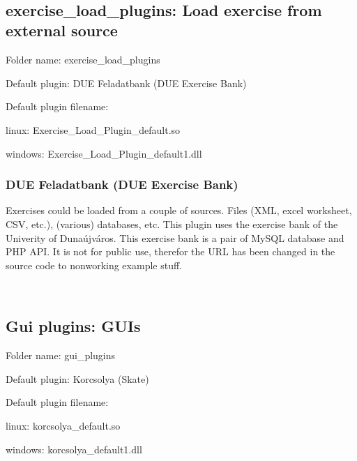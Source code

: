 ~\newline
~\newline
~\newline




\hypertarget{index_exercise_load_plugins}{}\subsection{exercise\+\_\+load\+\_\+plugins\+: Load exercise from external source}\label{index_exercise_load_plugins}

\begin{DoxyItemize}
\item Folder name\+: exercise\+\_\+load\+\_\+plugins
\item Default plugin\+: D\+UE Feladatbank (D\+UE Exercise Bank)
\item Default plugin filename\+:
\begin{DoxyItemize}
\item linux\+: Exercise\+\_\+\+Load\+\_\+\+Plugin\+\_\+default.\+so
\item windows\+: Exercise\+\_\+\+Load\+\_\+\+Plugin\+\_\+default1.\+dll
\end{DoxyItemize}
\end{DoxyItemize}\hypertarget{index_default_plugin}{}\subsubsection{D\+U\+E Feladatbank (\+D\+U\+E Exercise Bank)}\label{index_default_plugin}
Exercises could be loaded from a couple of sources. Files (X\+ML, excel worksheet, C\+SV, etc.), (various) databases, etc. This plugin uses the exercise bank of the Univerity of Dunaújváros. This exercise bank is a pair of My\+S\+QL database and P\+HP A\+PI. It is not for public use, therefor the U\+RL has been changed in the source code to nonworking example stuff.

~\newline
 

\hypertarget{index_gui_plugins}{}\subsection{Gui plugins\+: G\+U\+Is}\label{index_gui_plugins}

\begin{DoxyItemize}
\item Folder name\+: gui\+\_\+plugins
\item Default plugin\+: Korcsolya (Skate)
\item Default plugin filename\+:
\begin{DoxyItemize}
\item linux\+: korcsolya\+\_\+default.\+so
\item windows\+: korcsolya\+\_\+default1.\+dll
\end{DoxyItemize}
\end{DoxyItemize}

